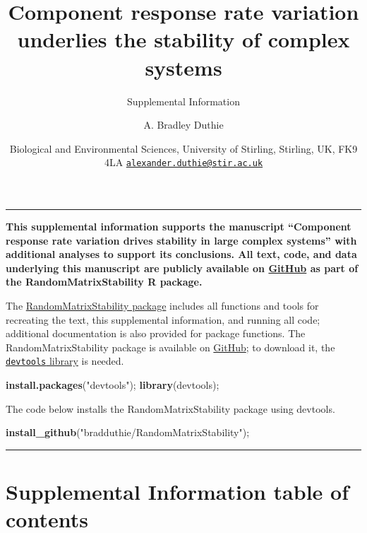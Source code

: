 \documentclass[]{article}
\title{Component response rate variation underlies the stability of complex
systems}
\subtitle{Supplemental Information}
\author{A. Bradley Duthie}
\date{Biological and Environmental Sciences, University of Stirling, Stirling,
UK, FK9 4LA
\href{mailto:alexander.duthie@stir.ac.uk}{\nolinkurl{alexander.duthie@stir.ac.uk}}}
\newenvironment{Shaded}{\begin{snugshade}}{\end{snugshade}}
\newcommand{\KeywordTok}[1]{\textcolor[rgb]{0.13,0.29,0.53}{\textbf{#1}}}
\newcommand{\NormalTok}[1]{#1}
\newcommand{\StringTok}[1]{\textcolor[rgb]{0.31,0.60,0.02}{#1}}
\begin{document}
\maketitle

\begin{center}\rule{0.5\linewidth}{\linethickness}\end{center}

\textbf{This supplemental information supports the manuscript
``Component response rate variation drives stability in large complex
systems'' with additional analyses to support its conclusions. All text,
code, and data underlying this manuscript are publicly available on
\href{https://github.com/bradduthie/RandomMatrixStability}{GitHub} as
part of the RandomMatrixStability R package.}

The
\href{https://github.com/bradduthie/RandomMatrixStability}{RandomMatrixStability
package} includes all functions and tools for recreating the text, this
supplemental information, and running all code; additional documentation
is also provided for package functions. The RandomMatrixStability
package is available on
\href{https://github.com/bradduthie/RandomMatrixStability}{GitHub}; to
download it, the
\href{https://cran.r-project.org/web/packages/devtools/index.html}{\texttt{devtools}
library} is needed.

\begin{Shaded}
\begin{Highlighting}[]
\KeywordTok{install.packages}\NormalTok{(}\StringTok{"devtools"}\NormalTok{);}
\KeywordTok{library}\NormalTok{(devtools);}
\end{Highlighting}
\end{Shaded}

The code below installs the RandomMatrixStability package using
devtools.

\begin{Shaded}
\begin{Highlighting}[]
\KeywordTok{install_github}\NormalTok{(}\StringTok{"bradduthie/RandomMatrixStability"}\NormalTok{);}
\end{Highlighting}
\end{Shaded}

\begin{center}\rule{0.5\linewidth}{\linethickness}\end{center}

\hypertarget{supplemental-information-table-of-contents}{%
\section{Supplemental Information table of
contents}\label{supplemental-information-table-of-contents}}
\end{document}
